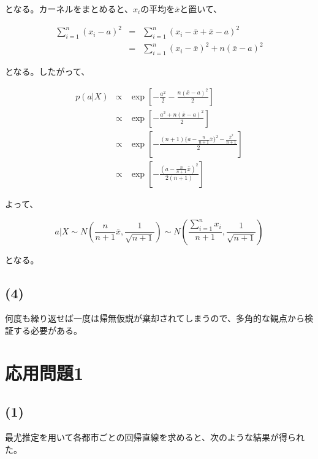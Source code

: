 \documentclass[a4j,xelatex,ja=standard,jafont=hiragino-pron, 9pt]{bxjsarticle}
\begin{document}
となる。カーネルをまとめると、$x_i$の平均を$\bar{x}$と置いて、

\begin{eqnarray}
  \sum_{i=1}^n(x_i - a)^2
  &=& \sum_{i=1}^n (x_i - \bar{x} + \bar{x} - a)^2 \nonumber \\
  &=& \sum_{i=1}^n (x_i - \bar{x})^2 + n(\bar{x} - a)^2
\end{eqnarray}

となる。したがって、

\begin{eqnarray}
  p(a|X)
  &\propto& \exp \left[- \frac{a^2}{2} - \frac{n(\bar{x} - a)^2}{2}\right] \nonumber \\
  &\propto& \exp \left[- \frac{a^2 + n(\bar{x} - a)^2}{2} \right] \nonumber \\
  &\propto& \exp
    \left[- \frac{
      (n + 1) \{ a - \frac{n}{n+1}\bar{x} \}^2 - \frac{\bar{x}^2}{n+1}
    }{2}
    \right] \nonumber \\
  &\propto& \exp \left[ - \frac{(a - \frac{n}{n+1}\bar{x})^2}{2(n+1)}\right]
\end{eqnarray}

よって、

\begin{equation}
  a|X \sim N\left(\frac{n}{n+1}\bar{x}, \frac{1}{\sqrt{n+1}}\right) \sim N\left(\frac{\sum_{i=1}^n x_i}{n+1}, \frac{1}{\sqrt{n+1}}\right)
\end{equation}

となる。

\subsection*{(4)}

何度も繰り返せば一度は帰無仮説が棄却されてしまうので、多角的な観点から検証する必要がある。

\section*{応用問題1}

\subsection*{(1)}\label{section}

最尤推定を用いて各都市ごとの回帰直線を求めると、次のような結果が得られた。
\end{document}
